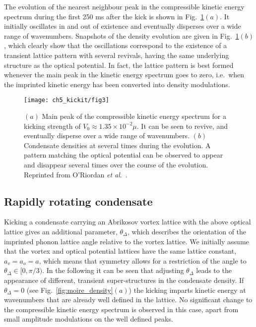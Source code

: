 The evolution of the nearest neighbour peak in the compressible kinetic energy spectrum during the first 250 ms after the kick is shown in Fig.~\ref{fig:novtx_p5k}$(a)$. It initially oscillates in and out of existence and eventually disperses over a wide range of wavenumbers. Snapshots of the density evolution are given in Fig.~\ref{fig:novtx_p5k}$(b)$, which clearly show that the oscillations correspond to the existence of a transient lattice pattern with several revivals, having the same underlying structure as the optical potential. In fact, the lattice pattern is best formed whenever the main peak in the kinetic energy spectrum goes to zero, i.e.~when the imprinted kinetic energy has been converted into density modulations.

\begin{figure}
    \centering
	\texttt{[image: ch5\_kickit/fig3]}
	\caption[Effect of kicking on non-rotating condensate.]{$(a)$ Main peak of the compressible kinetic energy spectrum for a kicking strength of $V_0 \approx 1.35\times10^{-2}\mu$. It can be seen to revive, and eventually disperse over a wide range of wavenumbers. $(b)$ Condensate densities at several times during the evolution. A pattern matching the optical potential can be observed to appear and disappear several times over the course of the evolution. Reprinted from O'Riordan {\textit{et al}.}~\cite{VTX:oriordan_pra_2016}.}
	\label{fig:novtx_p5k}
\end{figure}


\subsection{Rapidly rotating condensate}

    Kicking a condensate carrying an Abrikosov vortex lattice with the above optical lattice gives an additional parameter, $\theta_\Delta$, which describes the orientation of the imprinted phonon lattice angle relative to the vortex lattice. We initially assume that the vortex and optical potential lattices have the same lattice constant, $a_v=a_o=a$, which means that symmetry allows for a restriction of the angle to $\theta_\Delta\in[0,\pi/3)$. In the following it can be seen that adjusting $\theta_\Delta$ leads to the appearance of different, transient super-structures in the condensate density. If $\theta_\Delta=0$ (see Fig.~\ref{fig:moire_density}$(a)$) the kicking imparts kinetic energy at wavenumbers that are already well defined in the lattice. No significant change to the compressible kinetic energy spectrum is observed in this case, apart from small amplitude modulations on the well defined peaks.

